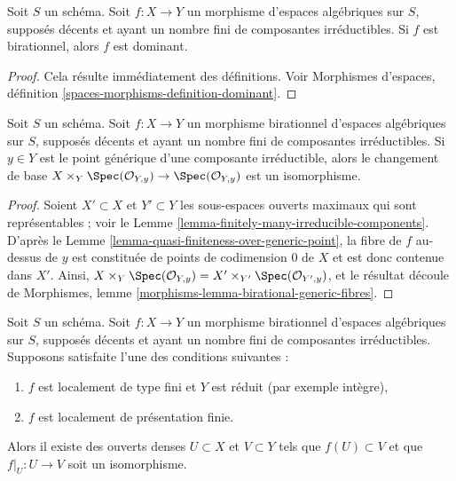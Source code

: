 \begin{lemma}
\label{lemma-birational-dominant}
Soit $S$ un schéma. Soit $f : X \to Y$ un morphisme d'espaces algébriques
sur $S$, supposés décents et ayant un nombre fini de composantes
irréductibles. Si $f$ est birationnel, alors $f$ est dominant.
\end{lemma}

\begin{proof}
Cela résulte immédiatement des définitions. Voir Morphismes d'espaces,
définition \ref{spaces-morphisms-definition-dominant}.
\end{proof}

\begin{lemma}
\label{lemma-birational-generic-fibres}
Soit $S$ un schéma. Soit $f : X \to Y$ un morphisme birationnel d'espaces
algébriques sur $S$, supposés décents et ayant un nombre fini de composantes
irréductibles. Si $y \in Y$ est le point générique d'une composante
irréductible, alors le changement de base
$X \times_Y \Spec(\mathcal{O}_{Y, y}) \to
\Spec(\mathcal{O}_{Y, y})$ est un isomorphisme.
\end{lemma}

\begin{proof}
Soient $X' \subset X$ et $Y' \subset Y$ les sous-espaces ouverts maximaux
qui sont représentables ; voir le
Lemme \ref{lemma-finitely-many-irreducible-components}.
D'après le Lemme \ref{lemma-quasi-finiteness-over-generic-point},
la fibre de $f$ au-dessus de $y$ est constituée de points de codimension $0$
de $X$ et est donc contenue dans $X'$. Ainsi,
$X \times_Y \Spec(\mathcal{O}_{Y, y}) =
X' \times_{Y'} \Spec(\mathcal{O}_{Y', y})$, et le résultat découle de
Morphismes, lemme \ref{morphisms-lemma-birational-generic-fibres}.
\end{proof}

\begin{lemma}
\label{lemma-birational-birational}
Soit $S$ un schéma. Soit $f : X \to Y$ un morphisme birationnel d'espaces
algébriques sur $S$, supposés décents et ayant un nombre fini de composantes
irréductibles. Supposons satisfaite l'une des conditions suivantes :
\begin{enumerate}
\item $f$ est localement de type fini et $Y$ est réduit
(par exemple intègre),
\item $f$ est localement de présentation finie.
\end{enumerate}
Alors il existe des ouverts denses $U \subset X$ et $V \subset Y$ tels que
$f(U) \subset V$ et que $f|_U : U \to V$ soit un isomorphisme.
\end{lemma}

